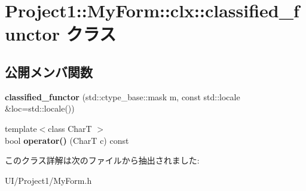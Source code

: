\hypertarget{class_project1_1_1_my_form_1_1clx_1_1classified__functor}{}\section{Project1\+:\+:My\+Form\+:\+:clx\+:\+:classified\+\_\+functor クラス}
\label{class_project1_1_1_my_form_1_1clx_1_1classified__functor}
\subsection*{公開メンバ関数}
\begin{DoxyCompactItemize}
\item 
\mbox{\label{class_project1_1_1_my_form_1_1clx_1_1classified__functor_aa57ebeb1e93b96b0c0fb3f90aa3459d0}} 
{\bfseries classified\+\_\+functor} (std\+::ctype\+\_\+base\+::mask m, const std\+::locale \&loc=std\+::locale())
\item 
\mbox{\label{class_project1_1_1_my_form_1_1clx_1_1classified__functor_aaf89c98c3bcbe1f6d696d3f229fb8d2b}} 
{\footnotesize template$<$class CharT $>$ }\\bool {\bfseries operator()} (CharT c) const
\end{DoxyCompactItemize}


このクラス詳解は次のファイルから抽出されました\+:\begin{DoxyCompactItemize}
\item 
U\+I/\+Project1/My\+Form.\+h\end{DoxyCompactItemize}
